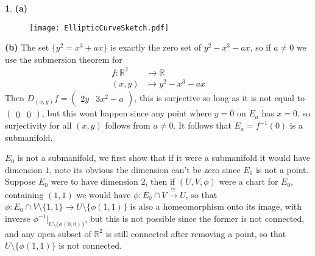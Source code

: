 \documentclass[10.5pt]{article}
\theoremstyle{definition}
\newtheorem{pb}{}
\newcommand{\set}[1]{\{#1\}}
\begin{document}
    \begin{pb}
        \textbf{(a)}
        \begin{figure}[h]
            \begin{center}
                \texttt{[image: EllipticCurveSketch.pdf]}
            \end{center}
        \end{figure}

        \textbf{(b)} The set \(\set{y^2 = x^3 + ax}\) is exactly the zero set of \(y^2 - x^3 - ax\), so if \(a \neq 0\) we use the submersion theorem for 
        \begin{align*}
            f : \mathbb{R}^2 &\to \mathbb{R} \\
            (x,y) &\mapsto y^2 - x^3 - ax
        \end{align*}
        Then \(D_{(x,y)}f = \begin{pmatrix} 2y & 3x^2 - a \end{pmatrix}\), this is surjective so long as it is not equal to \(\begin{pmatrix} 0&0 \end{pmatrix}\), but this wont happen since any point where \(y = 0\) on \(E_a\) has \(x = 0\), so surjectivity for all \((x,y)\) follows from \(a \neq 0\). It follows that \(E_a = f^{-1}(0)\) is a submanifold.

        \(E_0\) is not a submanifold, we first show that if it were a submanifold it would have dimension \(1\), note its obvious the dimension can't be zero since \(E_0\) is not a point. Suppose \(E_0\) were to have dimension \(2\), then if \((U,V,\phi)\) were a chart for \(E_0\), containing \((1,1)\) we would have \(\phi: E_0\cap V \overset{\cong}{\to} U\), so that \(\phi: E_0 \cap V \setminus \set{1,1} \to U \setminus \set{\phi(1,1)}\) is also a homeomorphism onto its image, with inverse \(\phi^{-1}\vert_{U \setminus \set{\phi(0,0)}}\), but this is not possible since the former is not connected, and any open subset of \(\mathbb{R}^2\) is still connected after removing a point, so that \(U \setminus \set{\phi(1,1)}\) is not connected.
        

\end{pb}
\end{document}
